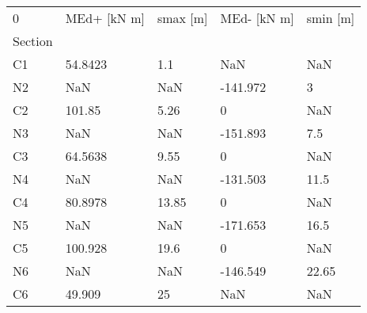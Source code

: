 \begin{tabular}{lllll}
\toprule
0 & MEd+ [kN m] & smax [m] & MEd- [kN m] & smin [m] \\
Section &             &          &             &          \\
\midrule
C1      &     54.8423 &      1.1 &         NaN &      NaN \\
N2      &         NaN &      NaN &    -141.972 &        3 \\
C2      &      101.85 &     5.26 &           0 &      NaN \\
N3      &         NaN &      NaN &    -151.893 &      7.5 \\
C3      &     64.5638 &     9.55 &           0 &      NaN \\
N4      &         NaN &      NaN &    -131.503 &     11.5 \\
C4      &     80.8978 &    13.85 &           0 &      NaN \\
N5      &         NaN &      NaN &    -171.653 &     16.5 \\
C5      &     100.928 &     19.6 &           0 &      NaN \\
N6      &         NaN &      NaN &    -146.549 &    22.65 \\
C6      &      49.909 &       25 &         NaN &      NaN \\
\bottomrule
\end{tabular}
